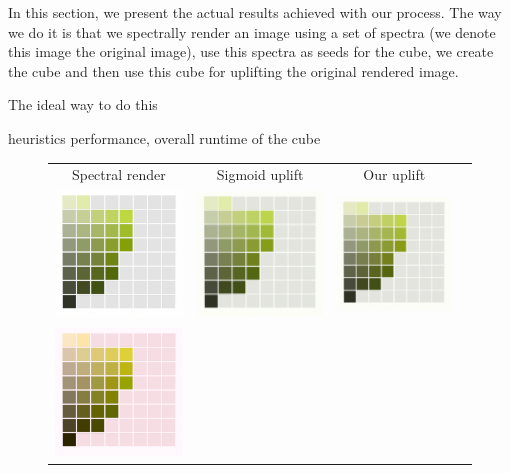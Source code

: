 In this section, we present the actual results achieved with our process. The way we do it is that
we spectrally render an image using a set of spectra (we denote this image the original image), use this spectra as seeds for the cube, we create the cube and then use this cube for uplifting the original rendered image. 

The ideal way to do this

heuristics performance, overall runtime of the cube



\begin{figure}[t]
	\centering
	{\sffamily
		\begin{tabular}{cccc}
			Spectral render & Sigmoid uplift & Our uplift
			\vspace{1em} \\
			\includegraphics[width=.30\linewidth]{img/results_art_page14_originalD65.png}
			&
			\includegraphics[width=.30\linewidth]{img/results_art_page14_sigmoidD65.png}
			& 
			\includegraphics[width=.30\linewidth]{img/results_art_page14_ourD65.png}
			\vspace{1em} \\
			\includegraphics[width=.30\linewidth]{img/results_art_page14_originalFL11.png}

\end{tabular}}
\end{figure}
